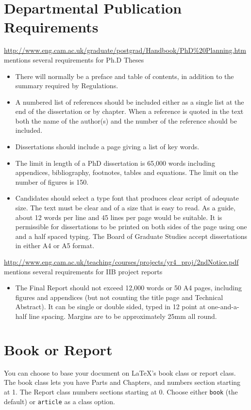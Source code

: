 \documentclass{article}
\begin{document}
\section{Departmental Publication Requirements}
 \url{http://www.eng.cam.ac.uk/graduate/postgrad/Handbook/PhD%20Planning.htm}
mentions several requirements for Ph.D Theses
\begin{itemize}
\item There will normally be a preface and table of contents, in addition to the summary required by Regulations.
\item A numbered list of references should be included either as a single list at the end of the dissertation or by chapter. When a reference is quoted in the text both the name of the author(s) and the number of the reference should be included.
\item Dissertations should include a page giving a list of key words. 
\item The limit in length of a PhD dissertation is 65,000 words including appendices, bibliography, footnotes, tables and equations. The limit on the number of figures is 150.
\item Candidates should select a type font that produces clear script of adequate size. The text must be clear and of a size that is easy to read. As a guide, about 12 words per line and 45 lines per page would be suitable. It is permissible for dissertations to be printed on both sides of the page using one and a half spaced typing. The Board of Graduate Studies accept dissertations in either A4 or A5 format. 
\end{itemize}

\noindent\url{http://www.eng.cam.ac.uk/teaching/courses/projects/yr4_proj/2ndNotice.pdf}
mentions several requirements for IIB project reports
\begin{itemize}
\item The Final Report should not exceed 12,000 words or 50 A4 pages, including figures and appendices (but not counting the title page and Technical Abstract). It can be single or double sided, typed in 12 point at one-and-a-half line spacing. Margins are to be approximately 25mm all round.
\end{itemize}
\section{Book or Report}
You can choose to base your document on LaTeX's book class or report
class. The book class lets you have Parts and Chapters, and numbers 
section starting at 1. The Report class numbers sections starting at 0.
Choose either \texttt{book} (the default) or  \texttt{article} as a 
class option.
\end{document}
